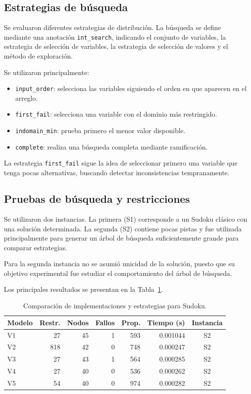 \documentclass[12pt]{article}
\begin{document}
\subsection{Estrategias de búsqueda}

Se evaluaron diferentes estrategias de distribución. La búsqueda se define mediante una anotación \texttt{int\_search}, indicando el conjunto de variables, la estrategia de selección de variables, la estrategia de selección de valores y el método de exploración.

Se utilizaron principalmente:

\begin{itemize}
    \item \texttt{input\_order}: selecciona las variables siguiendo el orden en que aparecen en el arreglo.
    \item \texttt{first\_fail}: selecciona una variable con el dominio más restringido.
    \item \texttt{indomain\_min}: prueba primero el menor valor disponible.
    \item \texttt{complete}: realiza una búsqueda completa mediante ramificación.
\end{itemize}

La estrategia \texttt{first\_fail} sigue la idea de seleccionar primero una variable que tenga pocas alternativas, buscando detectar inconsistencias tempranamente.

\subsection{Pruebas de búsqueda y restricciones}

Se utilizaron dos instancias. La primera (S1) corresponde a un Sudoku clásico con una solución determinada. La segunda (S2) contiene pocas pistas y fue utilizada principalmente para generar un árbol de búsqueda suficientemente grande para comparar estrategias.

Para la segunda instancia no se asumió unicidad de la solución, puesto que su objetivo experimental fue estudiar el comportamiento del árbol de búsqueda.

Los principales resultados se presentan en la Tabla~\ref{tab:sudoku-estrategias}.

\begin{table}[H]
\centering
\caption{Comparación de implementaciones y estrategias para Sudoku.}
\label{tab:sudoku-estrategias}
\begin{tabular}{lrrrrrc}
\hline
Modelo & Restr. & Nodos & Fallos & Prop. & Tiempo (s) & Instancia\\
\hline
V1 & 27  & 45 & 1 & 593 & 0.001044 & S2\\
V2 & 818 & 42 & 0 & 748 & 0.000247 & S2\\
V3 & 27  & 43 & 1 & 564 & 0.000285 & S2\\
V4 & 27  & 40 & 0 & 536 & 0.000262 & S2\\
V5 & 54  & 40 & 0 & 974 & 0.000282 & S2\\
\hline
\end{tabular}
\end{table}
\end{document}
